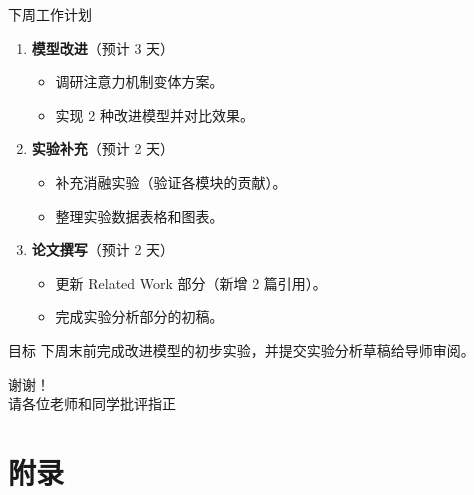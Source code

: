 \documentclass[aspectratio=169]{beamer}
\begin{document}
\begin{frame}{下周工作计划}
  \begin{enumerate}
    \item \textbf{模型改进}（预计 3 天）
      \begin{itemize}
        \item 调研注意力机制变体方案。
        \item 实现 2 种改进模型并对比效果。
      \end{itemize}
    \item \textbf{实验补充}（预计 2 天）
      \begin{itemize}
        \item 补充消融实验（验证各模块的贡献）。
        \item 整理实验数据表格和图表。
      \end{itemize}
    \item \textbf{论文撰写}（预计 2 天）
      \begin{itemize}
        \item 更新 Related Work 部分（新增 2 篇引用）。
        \item 完成实验分析部分的初稿。
      \end{itemize}
  \end{enumerate}

  \vspace{0.5em}
  \begin{block}{目标}
    下周末前完成改进模型的初步实验，并提交实验分析草稿给导师审阅。
  \end{block}
\end{frame}


\begin{frame}[c]{}
  \centering
  \Huge 谢谢！\\[0.5em]
  \Large 请各位老师和同学批评指正
\end{frame}


\appendix

\section{附录}
\end{document}
